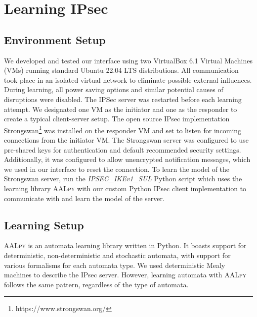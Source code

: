 \documentclass[runningheads]{llncs}
\begin{document}
\section{Learning IPsec} \label{chap:4} %
\subsection{Environment Setup} %
We developed and tested our interface using two VirtualBox 6.1 Virtual Machines (VMs) running standard Ubuntu 22.04 LTS distributions. All communication took place in an isolated virtual network to eliminate possible external influences. During learning, all power saving options and similar potential causes of disruptions were disabled. The IPSec server was restarted before each learning attempt. We designated one VM as the initiator and one as the responder to create a typical client-server setup. The open source IPsec implementation Strongswan\footnote{https://www.strongswan.org/} was installed on the responder VM and set to listen for incoming connections from the initiator VM. The Strongswan server was configured to use pre-shared keys for authentication and default recommended security settings. Additionally, it was configured to allow unencrypted notification messages, which we used in our interface to reset the connection. To learn the model of the Strongswan server, run the \emph{IPSEC\_IKEv1\_SUL} Python script which uses the learning library \textsc{AALpy} with our custom Python IPsec client implementation to communicate with and learn the model of the server. %

\subsection{Learning Setup} %
\textsc{AALpy} is an automata learning library written in Python. It boasts support for deterministic, non-deterministic and stochastic automata, with support for various formalisms for each automata type. We used deterministic Mealy machines to describe the IPsec server. However, learning automata with \textsc{AALpy} follows the same pattern, regardless of the type of automata.
\end{document}
